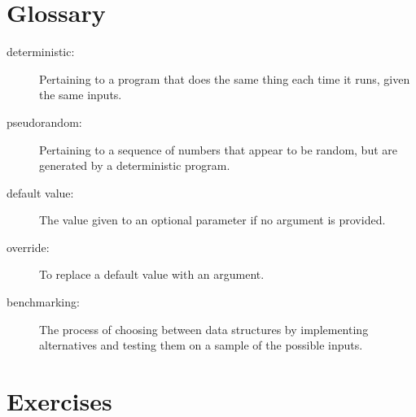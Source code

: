 

\section{Glossary}

\begin{description}

\item[deterministic:] Pertaining to a program that does the same
thing each time it runs, given the same inputs.

\item[pseudorandom:] Pertaining to a sequence of numbers that appear
to be random, but are generated by a deterministic program.

\item[default value:] The value given to an optional parameter if no
argument is provided.

\item[override:] To replace a default value with an argument.

\item[benchmarking:] The process of choosing between data structures
by implementing alternatives and testing them on a sample of the
possible inputs.  

\end{description}


\section{Exercises}

